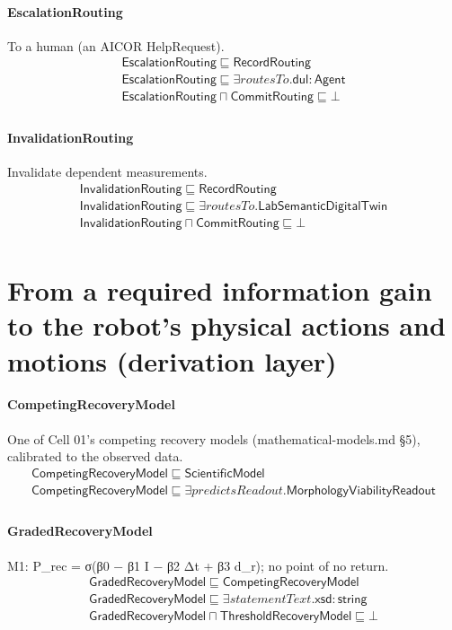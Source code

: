 \documentclass[10pt]{article}
\begin{document}
\paragraph{EscalationRouting} To a human (an AICOR HelpRequest).
\[\begin{array}{l}
\mathsf{EscalationRouting} \sqsubseteq  \mathsf{RecordRouting} \\
\mathsf{EscalationRouting} \sqsubseteq  \exists \mathit{routesTo}.\mathsf{dul{:}Agent} \\
\mathsf{EscalationRouting} \sqcap  \mathsf{CommitRouting} \sqsubseteq  \bot  \\
\end{array}\]
\paragraph{InvalidationRouting} Invalidate dependent measurements.
\[\begin{array}{l}
\mathsf{InvalidationRouting} \sqsubseteq  \mathsf{RecordRouting} \\
\mathsf{InvalidationRouting} \sqsubseteq  \exists \mathit{routesTo}.\mathsf{LabSemanticDigitalTwin} \\
\mathsf{InvalidationRouting} \sqcap  \mathsf{CommitRouting} \sqsubseteq  \bot  \\
\end{array}\]
\section*{From a required information gain to the robot's physical actions and motions (derivation layer)}
\paragraph{CompetingRecoveryModel} One of Cell 01's competing recovery models (mathematical-models.md §5), calibrated to the observed data.
\[\begin{array}{l}
\mathsf{CompetingRecoveryModel} \sqsubseteq  \mathsf{ScientificModel} \\
\mathsf{CompetingRecoveryModel} \sqsubseteq  \exists \mathit{predictsReadout}.\mathsf{MorphologyViabilityReadout} \\
\end{array}\]
\paragraph{GradedRecoveryModel} M1: P\_rec = σ(β0 − β1 I − β2 Δt + β3 d\_r); no point of no return.
\[\begin{array}{l}
\mathsf{GradedRecoveryModel} \sqsubseteq  \mathsf{CompetingRecoveryModel} \\
\mathsf{GradedRecoveryModel} \sqsubseteq  \exists \mathit{statementText}.\mathsf{xsd{:}string} \\
\mathsf{GradedRecoveryModel} \sqcap  \mathsf{ThresholdRecoveryModel} \sqsubseteq  \bot  \\
\end{array}\]
\end{document}

